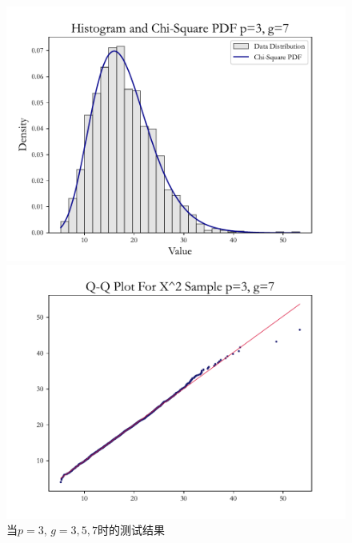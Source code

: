 \documentclass{article} %
\begin{document}
\begin{figure}[H]
    \begin{minipage}[b]{0.49\textwidth}
        \centering
        \includegraphics[width=\textwidth]{img/b/hist_plot_p=3_g=7.pdf}
    \end{minipage}
    \hfill
    \begin{minipage}[b]{0.49\textwidth}
        \centering
        \includegraphics[width=\textwidth]{img/b/qq_plot_p=3_g=7.pdf}
    \end{minipage}
    \caption{当\(p=3\), \(g=3,5,7\)时的测试结果}
    \label{fig:collection1}
\end{figure}
\end{document}

